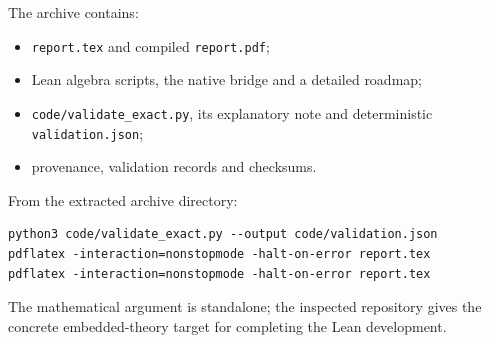 \documentclass[11pt]{article}
\theoremstyle{definition}
\newcommand{\code}[1]{\texttt{#1}}
\begin{document}
The archive contains:
\begin{itemize}
 \item \code{report.tex} and compiled \code{report.pdf};
 \item Lean algebra scripts, the native bridge and a detailed roadmap;
 \item \code{code/validate\_exact.py}, its explanatory note and
       deterministic \code{validation.json};
 \item provenance, validation records and checksums.
\end{itemize}
From the extracted archive directory:
\begin{lstlisting}
python3 code/validate_exact.py --output code/validation.json
pdflatex -interaction=nonstopmode -halt-on-error report.tex
pdflatex -interaction=nonstopmode -halt-on-error report.tex
\end{lstlisting}
The mathematical argument is standalone; the inspected repository gives
the concrete embedded-theory target for completing the Lean development.
\end{document}

